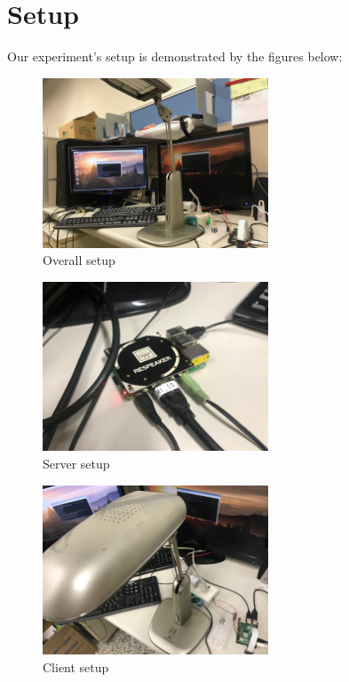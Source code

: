 \documentclass[12pt, a4paper, onside]{article}
\begin{document}
\section{Setup}
Our experiment's setup is demonstrated by the figures below:
\begin{figure}[h]
  \centering
  \includegraphics[angle=180, origin=c, width=0.6\textwidth]{img/overall_setup}
  \caption{Overall setup}
\end{figure}
\begin{figure}[h]
  \centering
  \includegraphics[angle=180, origin=c, width=0.6\textwidth]{img/server_setup}
  \caption{Server setup}
\end{figure}
\begin{figure}[h]
  \centering
  \includegraphics[angle=180, origin=c, width=0.6\textwidth]{img/client_setup}
  \caption{Client setup}
\end{figure}
\end{document}
